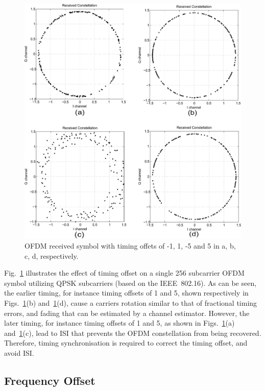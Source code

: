 \begin{figure}
	\centerline{\includegraphics [width=0.8\columnwidth] {Figures/timeoff.pdf} }
	\caption{OFDM received symbol with timing offets of -1, 1, -5 and 5 in a, b, c, d, respectively.}
	\label{fig:Timingoffsetconstellation}
\end{figure}

Fig.~\ref{fig:Timingoffsetconstellation} illustrates the effect of timing offset on a single 256 subcarrier OFDM symbol utilizing QPSK subcarriers (based on the IEEE~802.16).
As can be seen, the earlier timing, for instance timing offsets of 1 and 5, shown respectively in Figs.~\ref{fig:Timingoffsetconstellation}(b) and~\ref{fig:Timingoffsetconstellation}(d), cause a carriers rotation similar to that of fractional timing errors, and fading that can be estimated by a channel estimator.
However, the later timing, for instance timing offsets of 1 and 5, as shown in Figs.~\ref{fig:Timingoffsetconstellation}(a) and~\ref{fig:Timingoffsetconstellation}(c), lead to ISI that prevents the OFDM constellation from being recovered. 
Therefore, timing synchronisation is required to correct the timing offset, and avoid ISI.

\subsection{Frequency Offset}

